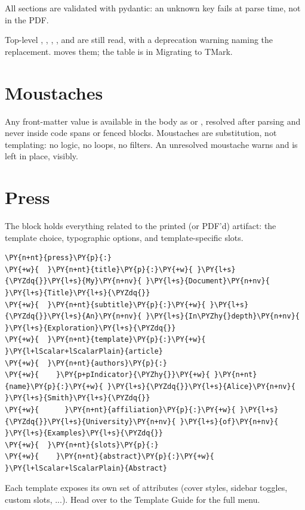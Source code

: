 \documentclass[a4paper,twoside]{article}
\begin{document}
All sections are validated with pydantic: an unknown key fails at parse time,
not in the PDF.
\begin{tscallout}[kind=note, title={The 0.6 layout is deprecated}]
Top-level , , , ,
 and  are still read, with a deprecation warning
naming the replacement.  moves them; the table is in
Migrating to TMark.
\end{tscallout}
\section{Moustaches}
Any front-matter value is available in the body as  or
, resolved after parsing and never inside code spans or
fenced blocks. Moustaches are substitution, not templating: no logic, no loops,
no filters. An unresolved moustache warns and is left in place, visibly.
\section{Press}
The  block holds everything related to the printed (or PDF'd) artifact: the template choice, typographic options, and template-specific slots.
\begin{tscode}[lang=yaml, engine=pygments]
\begin{Verbatim}[commandchars=\\\{\},breaklines, breakanywhere, commandchars=\\\{\}]
\PY{n+nt}{press}\PY{p}{:}
\PY{+w}{  }\PY{n+nt}{title}\PY{p}{:}\PY{+w}{ }\PY{l+s}{\PYZdq{}}\PY{l+s}{My}\PY{n+nv}{ }\PY{l+s}{Document}\PY{n+nv}{ }\PY{l+s}{Title}\PY{l+s}{\PYZdq{}}
\PY{+w}{  }\PY{n+nt}{subtitle}\PY{p}{:}\PY{+w}{ }\PY{l+s}{\PYZdq{}}\PY{l+s}{An}\PY{n+nv}{ }\PY{l+s}{In\PYZhy{}depth}\PY{n+nv}{ }\PY{l+s}{Exploration}\PY{l+s}{\PYZdq{}}
\PY{+w}{  }\PY{n+nt}{template}\PY{p}{:}\PY{+w}{ }\PY{l+lScalar+lScalarPlain}{article}
\PY{+w}{  }\PY{n+nt}{authors}\PY{p}{:}
\PY{+w}{    }\PY{p+pIndicator}{\PYZhy{}}\PY{+w}{ }\PY{n+nt}{name}\PY{p}{:}\PY{+w}{ }\PY{l+s}{\PYZdq{}}\PY{l+s}{Alice}\PY{n+nv}{ }\PY{l+s}{Smith}\PY{l+s}{\PYZdq{}}
\PY{+w}{      }\PY{n+nt}{affiliation}\PY{p}{:}\PY{+w}{ }\PY{l+s}{\PYZdq{}}\PY{l+s}{University}\PY{n+nv}{ }\PY{l+s}{of}\PY{n+nv}{ }\PY{l+s}{Examples}\PY{l+s}{\PYZdq{}}
\PY{+w}{  }\PY{n+nt}{slots}\PY{p}{:}
\PY{+w}{    }\PY{n+nt}{abstract}\PY{p}{:}\PY{+w}{ }\PY{l+lScalar+lScalarPlain}{Abstract}
\end{Verbatim}
\end{tscode}
Each template exposes its own set of attributes (cover styles, sidebar toggles, custom slots, ...). Head over to the Template Guide for the full menu.
\end{document}
